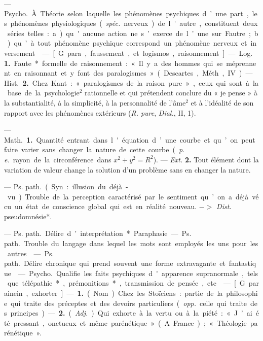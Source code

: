 \begin{itemize}[leftmargin=1cm, label=, itemsep=1pt]
 — \si{Psycho.} À. Théorie
selon laquelle les phénomènes psychiques d’une part, les phénomènes
physiologiques ({\it spéc.} nerveux) de
l'autre, constituent deux séries
telles : a) qu'aucune action ne
s’exerce de l’une sur Fautre; b) qu’à
tout phénomène psychique correspond un phénomène nerveux et
inversement.

 — [G. para, faussement, et
logismos, raisonnement] — \si{Log.} {\bf 1.}
Faute* formelle de raisonnement :
« Il y a des hommes qui se méprennent
en raisonnant et y font des
paralogismes » (Descartes, Méth.,
IV).— \si{Hist.} {\bf 2.} Chez Kant : « paralogismes de la raison pure », ceux qui
sont à la base de la psychologie$^2$
rationnelle et qui prétendent conclure du « je pense » à la substantialité, à la simplicité, à la personnalité de l’âme$^2$ et à l’idéalité de son
rapport avec les phénomènes extérieurs ({\it R. pure}, {\it Dial.}, II, 1).

 — \si{Math.} {\bf 1.} Quantité
entrant dans l'équation d’une courbe
et qu’on peut faire varier sans
changer la nature de cette courbe
({\it p. e.} rayon de la circonférence dans
$x^2+ y^2=R^2$). — {\it Ext.} {\bf 2.} Tout élément dont la variation de valeur
change la solution d’un problème
sans en changer la nature.

 — \si{Ps. path.} (Syn. : illusion du déjà-vu). Trouble de la perception caractérisé par le sentiment
qu’on a déjà vécu un état de conscience global qui est en réalité
nouveau. $->$ {\it Dist.} pseudomnésie*.

 — \si{Ps. path.} Délire d’interprétation*.

Paraphasie. — \si{Ps. path.} Trouble du
langage dans lequel les mots sont
employés les uns pour les autres.

 — \si{Ps. path.} Délire chronique qui prend souvent une forme
extravagante et fantastique.

 — \si{Psycho.} Qualifie les
faits psychiques d'apparence supranormale, tels que télépathie*, prémonitions*, transmission de pensée, etc.

 — [G. parainein, exhorter]
— {\bf 1.} (Nom) Chez les Stoïciens : partie
de la philosophie qui traite des préceptes et des devoirs particuliers
({\it opp.} celle qui traite des principes).
— {\bf 2.} ({\it Adj.}). Qui exhorte à la vertu
ou à la piété : « J’ai été pressant,
onctueux et même parénétique »
(A. France) ; « Théologie parénétique ».


\end{itemize}

